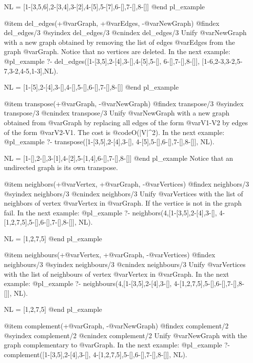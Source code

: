 NL = [1-[3,5,6],2-[3,4],3-[2],4-[5],5-[7],6-[],7-[],8-[]]
@end pl_example

@item del_edges(+@var{Graph}, +@var{Edges}, -@var{NewGraph})
@findex  del_edges/3
@syindex del_edges/3
@cnindex del_edges/3
Unify @var{NewGraph} with a new graph obtained by removing the list of
edges @var{Edges} from the graph @var{Graph}. Notice that no vertices
are deleted. In the next example:
@pl_example
?- del_edges([1-[3,5],2-[4],3-[],4-[5],5-[],
              6-[],7-[],8-[]],
             [1-6,2-3,3-2,5-7,3-2,4-5,1-3],NL).

NL = [1-[5],2-[4],3-[],4-[],5-[],6-[],7-[],8-[]]
@end pl_example

@item transpose(+@var{Graph}, -@var{NewGraph})
@findex  transpose/3
@syindex transpose/3
@cnindex transpose/3
Unify @var{NewGraph} with a new graph obtained from @var{Graph} by
replacing all edges of the form @var{V1-V2} by edges of the form
@var{V2-V1}. The cost is @code{O(|V|^2)}. In the next example:
@pl_example
?- transpose([1-[3,5],2-[4],3-[],
              4-[5],5-[],6-[],7-[],8-[]], NL).

NL = [1-[],2-[],3-[1],4-[2],5-[1,4],6-[],7-[],8-[]]
@end pl_example
Notice that an undirected graph is its own transpose.

@item neighbors(+@var{Vertex}, +@var{Graph}, -@var{Vertices})
@findex  neighbors/3
@syindex neighbors/3
@cnindex neighbors/3
Unify @var{Vertices} with the list of neighbors of vertex @var{Vertex}
in @var{Graph}. If the vertice is not in the graph fail. In the next
example:
@pl_example
?- neighbors(4,[1-[3,5],2-[4],3-[],
                4-[1,2,7,5],5-[],6-[],7-[],8-[]],
             NL).

NL = [1,2,7,5]
@end pl_example

@item neighbours(+@var{Vertex}, +@var{Graph}, -@var{Vertices})
@findex  neighbours/3
@syindex neighbours/3
@cnindex neighbours/3
Unify @var{Vertices} with the list of neighbours of vertex @var{Vertex}
in @var{Graph}. In the next example:
@pl_example
?- neighbours(4,[1-[3,5],2-[4],3-[],
                 4-[1,2,7,5],5-[],6-[],7-[],8-[]], NL).

NL = [1,2,7,5]
@end pl_example

@item complement(+@var{Graph}, -@var{NewGraph})
@findex  complement/2
@syindex complement/2
@cnindex complement/2
Unify @var{NewGraph} with the graph complementary to @var{Graph}.
 In the next example:
@pl_example
?- complement([1-[3,5],2-[4],3-[],
               4-[1,2,7,5],5-[],6-[],7-[],8-[]], NL).

